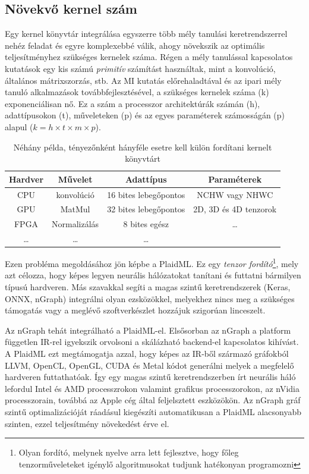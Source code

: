 \subsection{Növekvő kernel szám}
Egy kernel könyvtár integrálása egyszerre több mély tanulási keretrendszerrel nehéz feladat és egyre komplexebbé válik, ahogy növekszik az optimális teljesítményhez szükséges kernelek száma.
Régen a mély tanulással kapcsolatos kutatások egy kis számú \emph{primitív} számítást használtak, mint a konvolúció, általános mátrixszorzás, stb. Az MI kutatás előrehaladtával és az ipari mély tanuló alkalmazások továbbfejlesztésével, a szükséges kernelek száma (k) exponenciálisan nő.
Ez a szám a processzor architektúrák számán (h), adattípusokon (t), műveleteken (p) és az egyes paraméterek számosságán (p) alapul ($ k = h \times t \times m \times p $).
\begin{table}[!ht]
	\centering
	\begin{tabular}{|c|c|c|c|}
		
		Hardver & Művelet & Adattípus & Paraméterek \\ 
		\hline
		CPU & konvolúció & 16 bites lebegőpontos & NCHW vagy NHWC \\ 
		
		GPU & MatMul & 32 bites lebegőpontos & 2D, 3D és 4D tenzorok \\ 
		
		FPGA & Normalizálás & 8 bites egész &  \dots \\ 
		
		\dots & \dots & \dots & \\
	\end{tabular} 
	\caption{Néhány példa, tényezőnként hányféle esetre kell külön fordítani  kernelt könyvtárt }
	\label{table:kernels}
\end{table}

Ezen probléma megoldásához jön képbe a PlaidML. Ez egy \emph{tenzor fordító}\footnote{Olyan fordító, melynek nyelve arra lett fejlesztve, hogy főleg tenzorműveleteket igénylő algoritmusokat tudjunk hatékonyan programozni}, mely azt célozza, hogy képes legyen neurális hálózatokat tanítani és futtatni bármilyen típusú hardveren. Más szavakkal segíti a magas szintű keretrendszerek (Keras, ONNX, nGraph) integrálni olyan ezsközökkel, melyekhez nincs meg a szükséges támogatás vagy a meglévő szoftverkészlet hozzájuk szigorúan linceszelt.\cite{github:PlaidML}\cite{web:PlaidML}

Az nGraph tehát integrálható a PlaidML-el. Elsősorban az nGraph a platform független IR-rel igyekszik orvolsoni a skálázható backend-el kapcsolatos kihívást. A PlaidML ezt megtámogatja azzal, hogy képes az IR-ből származó gráfokból LLVM, OpenCL, OpenGL, CUDA és Metal kódot generálni melyek a megfelelő hardveren futtathatóak. Így egy magas szintű keretrendszerben írt neurális háló lefordul Intel és AMD processzrokon valamint grafikus processzorokon, az nVidia processzorain, továbbá az Apple cég által feljelsztett eszközökön. Az nGraph gráf szintű optimalizációját ráadásul kiegészíti automatikusan a PlaidML alacsonyabb szinten, ezzel teljesítmény növekedést érve el.

